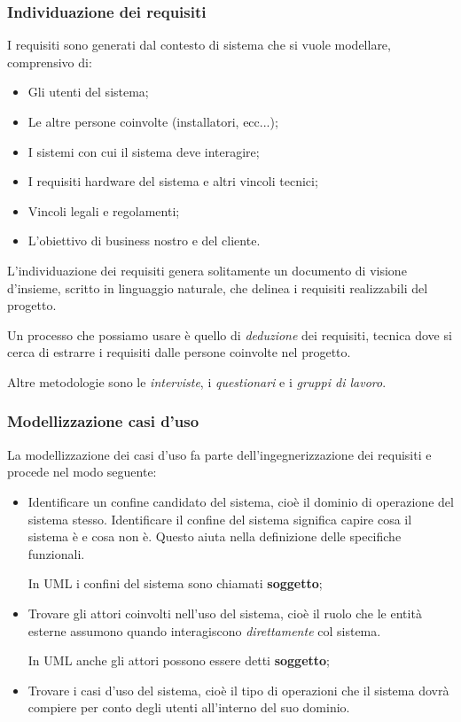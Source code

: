 \documentclass[a4paper,11pt]{article}
\begin{document}
\subsubsection{Individuazione dei requisiti}
I requisiti sono generati dal contesto di sistema che si vuole modellare, comprensivo di:
\begin{itemize}
	\item Gli utenti del sistema;
	\item Le altre persone coinvolte (installatori, ecc...);
	\item I sistemi con cui il sistema deve interagire; 
	\item I requisiti hardware del sistema e altri vincoli tecnici;
	\item Vincoli legali e regolamenti;
	\item L'obiettivo di business nostro e del cliente.
\end{itemize}

L'individuazione dei requisiti genera solitamente un documento di visione d'insieme, scritto in linguaggio naturale, che delinea i requisiti realizzabili del progetto.

Un processo che possiamo usare è quello di \textit{deduzione} dei requisiti, tecnica dove si cerca di estrarre i requisiti dalle persone coinvolte nel progetto.

Altre metodologie sono le \textit{interviste}, i \textit{questionari} e i \textit{gruppi di lavoro}.

\subsubsection{Modellizzazione casi d'uso}
La modellizzazione dei casi d'uso fa parte dell'ingegnerizzazione dei requisiti e procede nel modo seguente:
\begin{itemize}
	\item Identificare un confine candidato del sistema, cioè il dominio di operazione del sistema stesso. Identificare il confine del sistema significa capire cosa il sistema è e cosa non è. Questo aiuta nella definizione delle specifiche funzionali.

		In UML i confini del sistema sono chiamati \textbf{soggetto};
	\item Trovare gli attori coinvolti nell'uso del sistema, cioè il ruolo che le entità esterne assumono quando interagiscono \textit{direttamente} col sistema.

		In UML anche gli attori possono essere detti \textbf{soggetto};
	\item Trovare i casi d'uso del sistema, cioè il tipo di operazioni che il sistema dovrà compiere per conto degli utenti all'interno del suo dominio.
\end{itemize}
\end{document}
